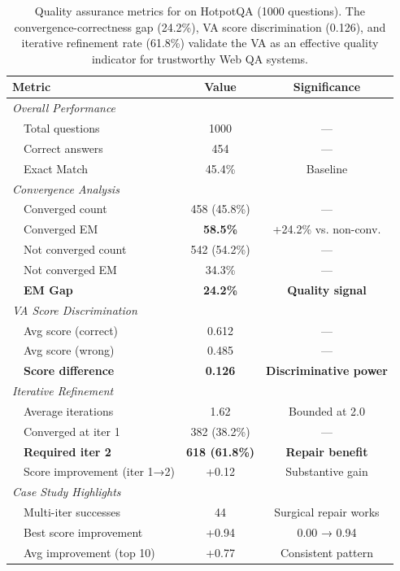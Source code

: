 
\begin{table}[t]
\centering
\caption{Quality assurance metrics for \sys on HotpotQA (1000 questions).
The convergence-correctness gap (24.2\%), VA score discrimination (0.126), and
iterative refinement rate (61.8\%) validate the VA as an effective quality
indicator for trustworthy Web QA systems.}
\label{tab:quality_metrics}
\small
\begin{tabular}{llcc}
\toprule
\multicolumn{2}{l}{\textbf{Metric}} & \textbf{Value} & \textbf{Significance} \\
\midrule
\multicolumn{4}{l}{\textit{Overall Performance}} \\
& Total questions          & 1000           & --- \\
& Correct answers          & 454            & --- \\
& Exact Match              & 45.4\%         & Baseline \\
\midrule
\multicolumn{4}{l}{\textit{Convergence Analysis}} \\
& Converged count          & 458 (45.8\%)   & --- \\
& Converged EM             & \textbf{58.5\%} & +24.2\% vs. non-conv. \\
& Not converged count      & 542 (54.2\%)   & --- \\
& Not converged EM         & 34.3\%         & --- \\
& \textbf{EM Gap}          & \textbf{24.2\%} & \textbf{Quality signal} \\
\midrule
\multicolumn{4}{l}{\textit{VA Score Discrimination}} \\
& Avg score (correct)      & 0.612          & --- \\
& Avg score (wrong)        & 0.485          & --- \\
& \textbf{Score difference} & \textbf{0.126} & \textbf{Discriminative power} \\
\midrule
\multicolumn{4}{l}{\textit{Iterative Refinement}} \\
& Average iterations       & 1.62           & Bounded at 2.0 \\
& Converged at iter 1      & 382 (38.2\%)   & --- \\
& \textbf{Required iter 2} & \textbf{618 (61.8\%)} & \textbf{Repair benefit} \\
& Score improvement (iter 1→2) & +0.12      & Substantive gain \\
\midrule
\multicolumn{4}{l}{\textit{Case Study Highlights}} \\
& Multi-iter successes     & 44             & Surgical repair works \\
& Best score improvement   & +0.94          & 0.00 → 0.94 \\
& Avg improvement (top 10) & +0.77          & Consistent pattern \\
\bottomrule
\end{tabular}
\end{table}

